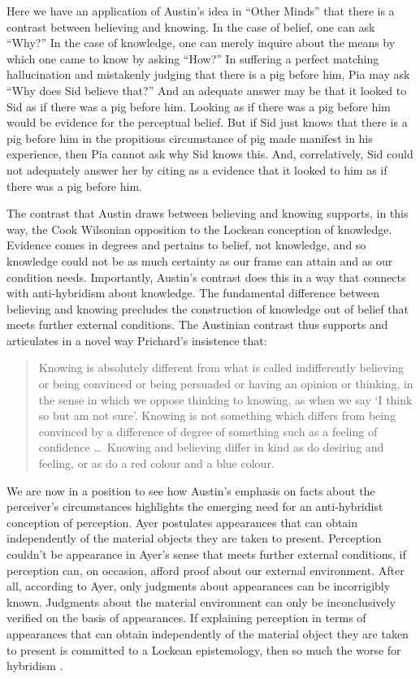 \documentclass[11pt]{article}
\begin{document}
Here we have an application of Austin's \citeyearpar{Austin:1961kl} idea in ``Other Minds'' that there is a contrast between believing and knowing. In the case of belief, one can ask ``Why?'' In the case of knowledge, one can merely inquire about the means by which one came to know by asking ``How?'' In suffering a perfect matching hallucination and mistakenly judging that there is a pig before him, Pia may ask ``Why does Sid believe that?'' And an adequate answer may be that it looked to Sid as if there was a pig before him. Looking as if there was a pig before him would be evidence for the perceptual belief. But if Sid just knows that there is a pig before him in the propitious circumstance of pig made manifest in his experience, then Pia cannot ask why Sid knows this. And, correlatively, Sid could not adequately answer her by citing as a evidence that it looked to him as if there was a pig before him. 

The contrast that Austin draws between believing and knowing supports, in this way, the Cook Wilsonian opposition to the Lockean conception of knowledge. Evidence comes in degrees and pertains to belief, not knowledge, and so knowledge could not be as much certainty as our frame can attain and as our condition needs. Importantly, Austin's contrast does this in a way that connects with anti-hybridism about knowledge. The fundamental difference between believing and knowing precludes the construction of knowledge out of belief that meets further external conditions. The Austinian contrast thus supports and articulates in a novel way Prichard's insistence that:
\begin{quote}
    Knowing is absolutely different from what is called indifferently believing or being convinced or being persuaded or having an opinion or thinking, in the sense in which we oppose thinking to knowing, as when we say `I think so but am not sure'. Knowing is not something which differs from being convinced by a difference of degree of something such as a feeling of confidence \ldots\ Knowing and believing differ in kind as do desiring and feeling, or as do a red colour and a blue colour. \citep[87]{Prichard:1950tg}
\end{quote} 

We are now in a position to see how Austin's emphasis on facts about the perceiver's circumstances highlights the emerging need for an anti-hybridist conception of perception. Ayer postulates appearances that can obtain independently of the material objects they are taken to present. Perception couldn't be appearance in Ayer's sense that meets further external conditions, if perception can, on occasion, afford proof about our external environment. After all, according to Ayer, only judgments about appearances can be incorrigibly known. Judgments about the material environment can only be inconclusively verified on the basis of appearances. If explaining perception in terms of appearances that can obtain independently of the material object they are taken to present is committed to a Lockean epistemology, then so much the worse for hybridism \citep[see][for a contemporary development of this negative thought]{Putnam:1994kx}. 
\end{document}
